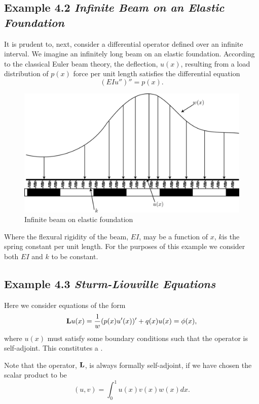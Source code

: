\subsection{Example 4.2 \textit{Infinite Beam on an Elastic Foundation}}
    It is prudent to, next, consider a differential operator defined over an infinite interval. We imagine an infinitely long beam on an elastic foundation. According to the classical Euler beam theory, the deflection, \(u(x)\), resulting from a load distribution of \(p(x)\) force per unit length satisfies the differential equation
    \begin{equation}
        (EIu'')'' = p(x).
    \end{equation}
    \begin{figure}
        \centering
        \includegraphics[width=0.75\linewidth]{include/Beam.png}
        \caption{Infinite beam on elastic foundation}
    \end{figure}

    Where the flexural rigidity of the beam, \(EI\), may be a function of \(x\), \(k\)is the spring constant per unit length. For the purposes of this example we consider both \(EI\) and \(k\) to be constant.

\subsection{Example 4.3 \textit{Sturm-Liouville Equations}}
    Here we consider equations of the form 
    \begin{equation*}\label{eq:sturmGen}
        \mathrm{\bf{L}} u(x) = \frac{1}{w}(p(x)u'(x))'+q(x)u(x) = \phi(x),
    \end{equation*}
    where \(u(x)\) must satisfy some boundary conditions such that the operator is self-adjoint. This constitutes a . 

    Note that the operator, \(\mathrm{\bf{L}}\), is always formally self-adjoint, if we have chosen the scalar product to be
    \begin{equation*}
        (u,v) = \int_{0}^{1} u(x)v(x)w(x) dx.
    \end{equation*}

